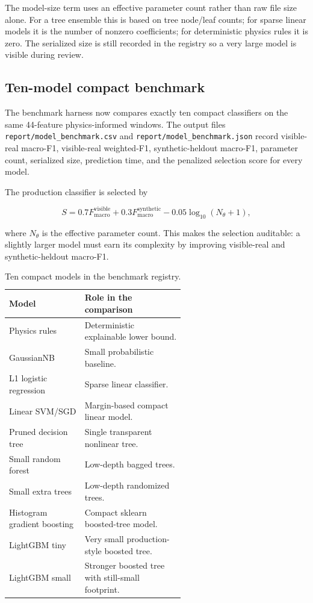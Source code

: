 \documentclass[11pt]{article}
\begin{document}
The model-size term uses an effective parameter count rather than raw file size
alone. For a tree ensemble this is based on tree node/leaf counts; for sparse
linear models it is the number of nonzero coefficients; for deterministic
physics rules it is zero. The serialized size is still recorded in the registry
so a very large model is visible during review.

\subsection{Ten-model compact benchmark}

The benchmark harness now compares exactly ten compact classifiers on the same
44-feature physics-informed windows. The output files
\texttt{report/model\_benchmark.csv} and \texttt{report/model\_benchmark.json}
record visible-real macro-F1, visible-real weighted-F1, synthetic-heldout
macro-F1, parameter count, serialized size, prediction time, and the penalized
selection score for every model.

The production classifier is selected by

\begin{equation}
  S =
  0.7F^{\mathrm{visible}}_{\mathrm{macro}}
  +0.3F^{\mathrm{synthetic}}_{\mathrm{macro}}
  -0.05\log_{10}(N_{\theta}+1),
  \label{eq:model_selection}
\end{equation}

where $N_{\theta}$ is the effective parameter count. This makes the selection
auditable: a slightly larger model must earn its complexity by improving
visible-real and synthetic-heldout macro-F1.

\begin{table}[H]
\centering
\caption{Ten compact models in the benchmark registry.}
\begin{tabular}{lp{0.58\linewidth}}
\toprule
Model & Role in the comparison \\
\midrule
Physics rules & Deterministic explainable lower bound. \\
GaussianNB & Small probabilistic baseline. \\
L1 logistic regression & Sparse linear classifier. \\
Linear SVM/SGD & Margin-based compact linear model. \\
Pruned decision tree & Single transparent nonlinear tree. \\
Small random forest & Low-depth bagged trees. \\
Small extra trees & Low-depth randomized trees. \\
Histogram gradient boosting & Compact sklearn boosted-tree model. \\
LightGBM tiny & Very small production-style boosted tree. \\
LightGBM small & Stronger boosted tree with still-small footprint. \\
\bottomrule
\end{tabular}
\label{tab:model_benchmark}
\end{table}
\end{document}
